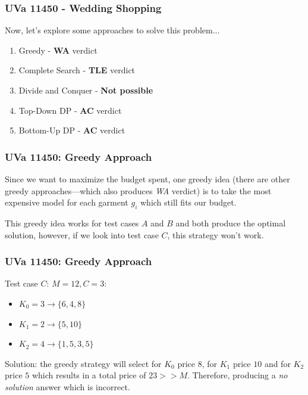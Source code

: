 \documentclass{beamer}
\begin{document}
\begin{frame}[fragile]
\frametitle{UVa 11450 - Wedding Shopping}

Now, let's explore some approaches to solve this problem...

\vspace{0.3cm}

\begin{enumerate}
    \item Greedy - \textbf{WA} verdict
    \item Complete Search - \textbf{TLE} verdict
    \item Divide and Conquer - \textbf{Not possible}
    \item Top-Down DP - \textbf{AC} verdict
    \item Bottom-Up DP - \textbf{AC} verdict
\end{enumerate}

\end{frame}

\begin{frame}[fragile]
\frametitle{UVa 11450: Greedy Approach}

Since we want to maximize the budget spent, one greedy idea (there are other greedy approaches—which also produces \textit{WA} verdict) is to take the most expensive model for each garment $g_i$ which still fits our budget. \\

\vspace{0.3cm}

This greedy idea works for test cases $A$ and $B$ and both produce the optimal solution, however, if we look into test case $C$, this strategy won't work.

\end{frame}

\begin{frame}[fragile]
\frametitle{UVa 11450: Greedy Approach}

\color{red}Test case $C$: \color{black} $M=12, C=3$:
\begin{itemize}
    \item $K_0=3 \rightarrow \{6,4,8\}$
    \item $K_1=2 \rightarrow \{5,10\}$
    \item $K_2=4 \rightarrow \{1,5,3,5\}$        
\end{itemize}

\pause
\vspace{0.3cm}

\color{red}Solution: \color{black} the greedy strategy will select for $K_0$ price $8$, for $K_1$ price $10$ and for $K_2$ price $5$ which results in a total price of $23 >> M$. Therefore, producing a \textit{no solution} answer which is incorrect.

\end{frame}
\end{document}
